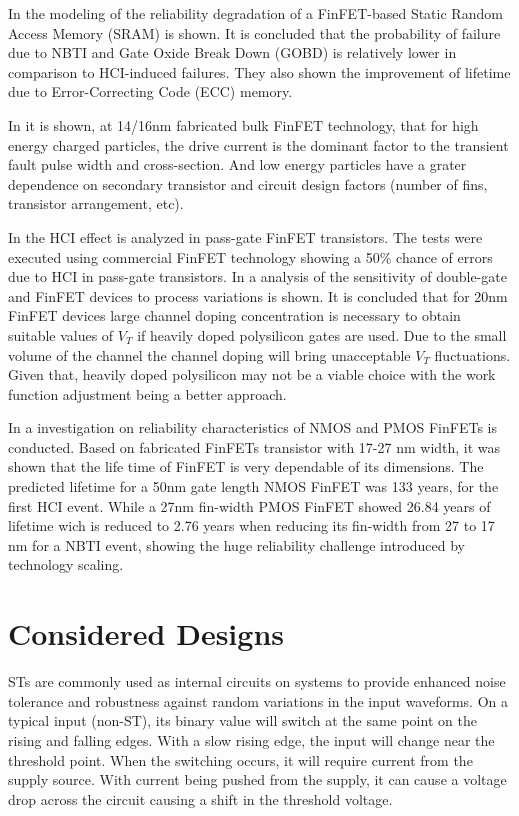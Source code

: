 \documentclass[pgmicro,mestrado,english]{iiufrgs}
\begin{document}
In \cite{FinFET04} the modeling of the reliability degradation of a FinFET-based Static Random Access Memory (SRAM) is shown. It is concluded that the probability of failure due to NBTI and Gate Oxide Break Down (GOBD) is relatively lower in comparison to HCI-induced failures. They also shown the improvement of lifetime due to Error-Correcting Code (ECC) memory.

In \cite{FinFET01} it is shown, at 14/16nm fabricated bulk FinFET technology, that for high energy charged particles, the drive current is the dominant factor to the transient fault pulse width and cross-section. And low energy particles have a grater dependence on secondary transistor and circuit design factors (number of fins, transistor arrangement, etc).

In \cite{FinFET02} the HCI effect is analyzed in pass-gate FinFET transistors. The tests were executed using commercial FinFET technology showing a 50\% chance of errors due to HCI in pass-gate transistors. In \cite{FinFET03} a analysis of the sensitivity of double-gate and FinFET devices to process variations is shown. It is concluded that for 20nm FinFET devices large channel doping concentration is necessary to obtain suitable values of $V_T$ if heavily doped polysilicon gates are used. Due to the small volume of the channel the channel doping will bring unacceptable $V_T$ fluctuations. Given that, heavily doped polysilicon may not be a viable choice with the work function adjustment being a better approach.

 In \cite{FINFET05} a investigation on reliability characteristics of NMOS and PMOS FinFETs is conducted. Based on fabricated FinFETs transistor with 17-27 nm width, it was shown that the life time of FinFET is very dependable of its dimensions. The predicted lifetime for a 50nm gate length NMOS FinFET was 133 years, for the first HCI event. While a 27nm fin-width PMOS FinFET showed 26.84 years of lifetime wich is reduced to 2.76 years when reducing its fin-width from 27 to 17 nm for a NBTI event, showing the huge reliability challenge introduced by technology scaling.



\chapter{Considered Designs}

STs are commonly used as internal circuits on systems to provide enhanced noise tolerance and robustness against random variations in the input waveforms. On a typical input (non-ST), its binary value will switch at the same point on the rising and falling edges. With a slow rising edge, the input will change near the threshold point. When the switching occurs, it will require current from the supply source. With current being pushed from the supply, it can cause a voltage drop across the circuit causing a shift in the threshold voltage.
\end{document}
